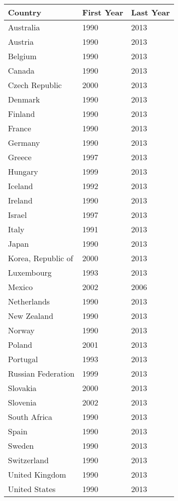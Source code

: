 \begingroup\tiny
\begin{tabular}{lll}
  \hline
Country & First Year & Last Year \\ 
  \hline
Australia & 1990 & 2013 \\ 
  Austria & 1990 & 2013 \\ 
  Belgium & 1990 & 2013 \\ 
  Canada & 1990 & 2013 \\ 
  Czech Republic & 2000 & 2013 \\ 
  Denmark & 1990 & 2013 \\ 
  Finland & 1990 & 2013 \\ 
  France & 1990 & 2013 \\ 
  Germany & 1990 & 2013 \\ 
  Greece & 1997 & 2013 \\ 
  Hungary & 1999 & 2013 \\ 
  Iceland & 1992 & 2013 \\ 
  Ireland & 1990 & 2013 \\ 
  Israel & 1997 & 2013 \\ 
  Italy & 1991 & 2013 \\ 
  Japan & 1990 & 2013 \\ 
  Korea, Republic of & 2000 & 2013 \\ 
  Luxembourg & 1993 & 2013 \\ 
  Mexico & 2002 & 2006 \\ 
  Netherlands & 1990 & 2013 \\ 
  New Zealand & 1990 & 2013 \\ 
  Norway & 1990 & 2013 \\ 
  Poland & 2001 & 2013 \\ 
  Portugal & 1993 & 2013 \\ 
  Russian Federation & 1999 & 2013 \\ 
  Slovakia & 2000 & 2013 \\ 
  Slovenia & 2002 & 2013 \\ 
  South Africa & 1990 & 2013 \\ 
  Spain & 1990 & 2013 \\ 
  Sweden & 1990 & 2013 \\ 
  Switzerland & 1990 & 2013 \\ 
  United Kingdom & 1990 & 2013 \\ 
  United States & 1990 & 2013 \\ 
   \hline
\end{tabular}
\endgroup
